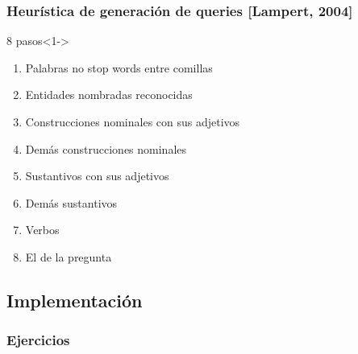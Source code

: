 \begin{frame}
\frametitle{Heurística de generación de queries [Lampert, 2004]}
\begin{block}{8 pasos}<1->
\begin{enumerate}
\item Palabras no stop words entre comillas
\item Entidades nombradas reconocidas
\item Construcciones nominales con sus adjetivos
\item Demás construcciones nominales
\item Sustantivos con sus adjetivos
\item Demás sustantivos
\item Verbos
\item El  de la pregunta
\end{enumerate}
\end{block}
\end{frame}

\subsection{Implementación}

\subsubsection*{Ejercicios}

